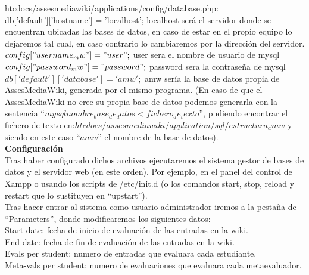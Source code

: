 htcdocs/assesmediawiki/applications/config/database.php:\\

db['default']['hostname'] = 'localhost'; localhost será el servidor donde se encuentran ubicadas las bases de datos, en caso de estar en el propio equipo lo dejaremos tal cual, en caso contrario lo cambiaremos por la dirección del servidor.\\

$config["username_mw"] = "user";$ user sera el nombre de usuario de mysql\\

$config["password_mw"] = "password";$ password sera la contraseña de mysql\\

$db['default']['database'] = 'amw';$ amw sería la base de datos propia de AssesMediaWiki, generada por el mismo programa. (En caso de que el AssesMediaWiki no cree su propia base de datos podemos generarla con la sentencia $“mysql nombre_base_de_datos < fichero_de_texto”$, pudiendo encontrar el fichero de texto en:$ htcdocs/assesmediawiki/application/sql/estructura_amw$ y siendo en este caso $“amw”$ el nombre de la base de datos).\\

\textbf{Configuración}\\

Tras haber configurado dichos archivos ejecutaremos el sistema gestor de bases de datos y el servidor web (en este orden). Por ejemplo, en el panel del control de Xampp o usando los scripts de /etc/init.d (o los comandos start, stop, reload y restart que lo sustituyen en “upstart”).\\

Tras hacer entrar al sistema como usuario administrador iremos a la pestaña de “Parameters”, donde modificaremos los siguientes datos:\\

Start date: fecha de inicio de evaluación de las entradas en la wiki.\\

End date: fecha de fin de evaluación de las entradas en la wiki.\\

Evals per student: numero de entradas que evaluara cada estudiante.\\

Meta-vals per student: numero de evaluaciones que evaluara cada metaevaluador.\\

